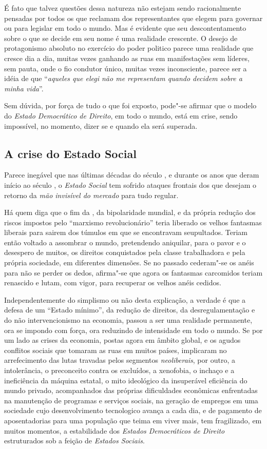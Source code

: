 É fato que talvez questões dessa natureza não estejam sendo
racionalmente pensadas por todos os que reclamam dos representantes que
elegem para governar ou para legislar em todo o mundo. Mas é evidente
que seu descontentamento sobre o que se decide em seu nome é uma
realidade crescente. O desejo de protagonismo absoluto no exercício do
poder politico parece uma realidade que cresce dia a dia, muitas vezes
ganhando as ruas em manifestações sem líderes, sem pauta, onde o fio
condutor único, muitas vezes inconsciente, parece ser a idéia de que
``\emph{aqueles que elegi não me representam quando decidem sobre a
minha vida}''.

Sem dúvida, por força de tudo o que foi exposto, pode"-se afirmar que o
modelo do \emph{Estado Democrático de Direito}, em todo o mundo, está em
crise, sendo impossível, no momento, dizer se e quando ela será
superada.

\subsection{A crise do Estado Social}

Parece inegável que nas últimas décadas do século , e durante os anos
que deram início ao século , o \emph{Estado Social} tem sofrido
ataques frontais dos que desejam o retorno da \emph{mão invisível do
mercado} para tudo regular.

Há quem diga que o fim da , da bipolaridade mundial, e da própria
redução dos riscos impostos pelo ``marxismo revolucionário'' teria
liberado os velhos fantasmas liberais para sairem dos túmulos em que se
encontravam seupultados. Teriam então voltado a assombrar o mundo,
pretendendo aniquilar, para o pavor e o desespero de muitos, os direitos
conquistados pela classe trabalhadora e pela própria sociedade, em
diferentes dimensões. Se no passado cederam"-se os anéis para não se
perder os dedos, afirma"-se que agora os fantasmas carcomidos teriam
renascido e lutam, com vigor, para recuperar os velhos anéis cedidos.

Independentemente do simplismo ou não desta explicação, a verdade é que
a defesa de um ``Estado mínimo'', da redução de direitos, da
desregulamentação e do não intervencionismo na economia, passou a ser
uma realidade permanente, ora se impondo com força, ora reduzindo de
intensidade em todo o mundo. Se por um lado as crises da economia,
postas agora em âmbito global, e os agudos conflitos sociais que tomaram
as ruas em muitos países, implicaram no arrefecimento das lutas travadas
pelos segmentos \emph{neoliberais}, por outro, a intolerância, o
preconceito contra os excluídos, a xenofobia, o inchaço e a ineficiência
da máquina estatal, o mito ideológico da insuperável eficiência do mundo
privado, acompanhados das próprias dificuldades econômicas enfrentadas
na manutenção de programas e serviços sociais, na geração de empregos em
uma sociedade cujo desenvolvimento tecnologico avança a cada dia, e de
pagamento de aposentadorias para uma população que teima em viver mais,
tem fragilizado, em muitos momentos, a estabilidade dos \emph{Estados
Democráticos de Direito} estruturados sob a feição de \emph{Estados
Sociais}.

